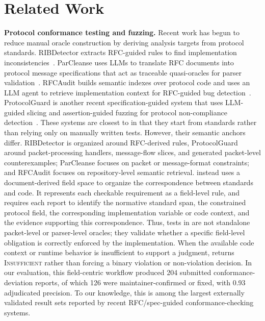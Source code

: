 \section{Related Work}
\label{sec:related}

\textbf{Protocol conformance testing and fuzzing.}
Recent work has begun to reduce manual oracle construction by deriving analysis targets from protocol standards. 
RIBDetector extracts RFC-guided rules to find implementation inconsistencies~\cite{chen2022ribdetector}. 
ParCleanse uses LLMs to translate RFC documents into protocol message specifications that act as traceable quasi-oracles for parser validation~\cite{zheng2025parcleanse}. 
RFCAudit builds semantic indexes over protocol code and uses an LLM agent to retrieve implementation context for RFC-guided bug detection~\cite{zheng2025rfcaudit}. 
ProtocolGuard is another recent specification-guided system that uses LLM-guided slicing and assertion-guided fuzzing for protocol non-compliance detection~\cite{song2026protocolguard}.
These systems are closest to \tool{} in that they start from standards rather than relying only on manually written tests. 
However, their semantic anchors differ. 
RIBDetector is organized around RFC-derived rules, ProtocolGuard around packet-processing handlers, message-flow slices, and generated packet-level counterexamples; ParCleanse focuses on packet or message-format constraints; and RFCAudit focuses on repository-level semantic retrieval. 
\tool{} instead uses a document-derived field space to organize the correspondence between standards and code.
It represents each checkable requirement as a field-level rule, and requires each report to identify the normative standard span, the constrained protocol field, the corresponding implementation variable or code context, and the evidence supporting this correspondence.
Thus, tests in \tool{} are not standalone packet-level or parser-level oracles; they validate whether a specific field-level obligation is correctly enforced by the implementation.
When the available code context or runtime behavior is insufficient to support a judgment, \tool{} returns \textsc{Insufficient} rather than forcing a binary violation or non-violation decision.
In our evaluation, this field-centric workflow produced 204 submitted conformance-deviation reports, of which 126 were maintainer-confirmed or fixed, with 0.93 adjudicated precision.
To our knowledge, this is among the largest externally validated result sets reported by recent RFC/spec-guided conformance-checking systems.

